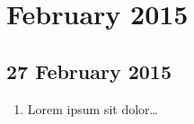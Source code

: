 
\section{February 2015}

\subsection*{27 February 2015}

\begin{enumerate}
	\item Lorem ipsum sit dolor\ldots
\end{enumerate}